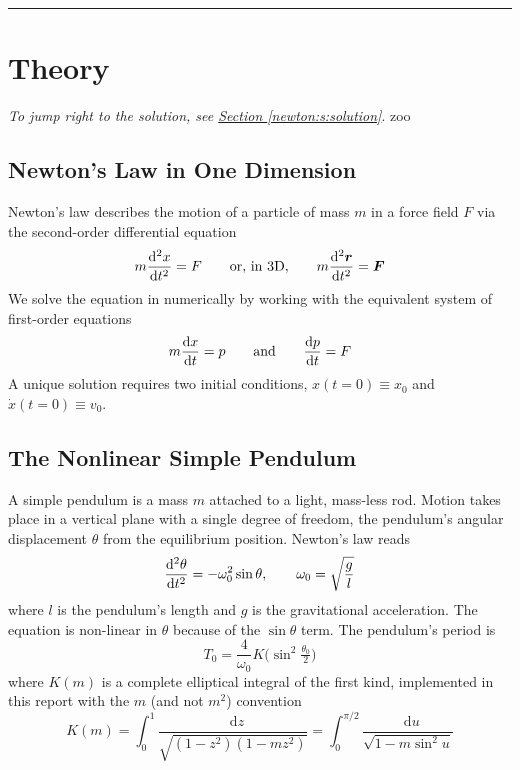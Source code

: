 \documentclass[11pt, a4paper]{article}
\newcommand{\diff}{\mathop{}\!\mathrm{d}} %
\newcommand{\eqtext}[1]{\qquad \text{#1} \qquad}
\begin{document}
\vspace{2mm}

\rule{\textwidth}{0.2pt}

\section{Theory} \label{newton:s:theory}
\vspace{-2mm}
\textit{To jump right to the solution, see \hyperref[newton:s:solution]{Section \ref{newton:s:solution}}}.
zoo

\subsection{Newton's Law in One Dimension}
Newton's law describes the motion of a particle of mass $ m $ in a force field $ F $ via the second-order differential equation
\begin{equation*}
	m \dv[2]{x}{t} = F \eqtext{or, in 3D,} m \dv[2]{\bm{r}}{t} = \bm{F}
\end{equation*}
We solve the equation in numerically by working with the equivalent system of first-order equations
\begin{equation*}
	m \dv{x}{t} = p \eqtext{and} \dv{p}{t} = F
\end{equation*}
A unique solution requires two initial conditions, $ x(t = 0) \equiv x_{0} $ and $ \dot{x}(t = 0) \equiv v_{0} $. 


\subsection{The Nonlinear Simple Pendulum}
A simple pendulum is a mass $ m $ attached to a light, mass-less rod. Motion takes place in a vertical plane with a single degree of freedom, the pendulum's angular displacement $ \theta $ from the equilibrium position. Newton's law reads
\begin{equation*}
	\dv[2]{\theta}{t} = - \omega_{0}^{2} \sin \theta, \qquad \omega_{0} = \sqrt{\frac{g}{l}}
\end{equation*}
where $ l $ is the pendulum's length and $ g $ is the gravitational acceleration. The equation is non-linear in $ \theta $ because of the $ \sin \theta $ term. The pendulum's period is
\begin{equation*}
	T_{0} = \frac{4}{\omega_{0}}K\big(\sin^{2}\tfrac{\theta_{0}}{2}\big)
\end{equation*}
where $ K(m) $ is a complete elliptical integral of the first kind, implemented in this report with the $ m $ (and not $ m^{2} $) convention
\begin{equation*}
	K(m) = \int_{0}^{1}\frac{\diff z}{\sqrt{(1 - z^{2})(1 - mz^{2})}} = \int_{0}^{\pi/2} \frac{\diff u}{\sqrt{1 - m\sin^{2}u}}
\end{equation*}
\end{document}
